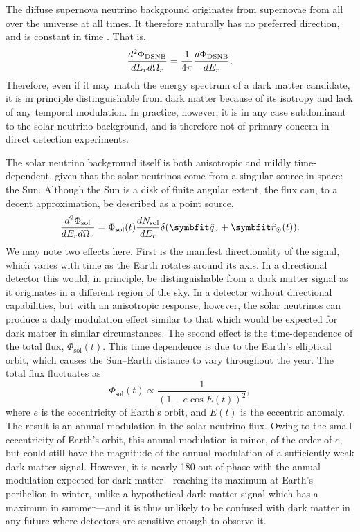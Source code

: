 The diffuse supernova neutrino background originates from supernovae from all over the universe at all times. It therefore naturally has no preferred direction, and is constant in time \parencite{Beacom2010}. That is,
\begin{equation}
    \frac{d^2\Phi_\text{DSNB}}{dE_rd\Omega_r}=\frac{1}{4\pi}\frac{d\Phi_\text{DSNB}}{dE_r}.
\end{equation}
Therefore, even if it may match the energy spectrum of a dark matter candidate, it is in principle distinguishable from dark matter because of its isotropy and lack of any temporal modulation. In practice, however, it is in any case subdominant to the solar neutrino background, and is therefore not of primary concern in direct detection experiments.

The solar neutrino background itself is both anisotropic and mildly time-dependent, given that the solar neutrinos come from a singular source in space: the Sun. Although the Sun is a disk of finite angular extent, the flux can, to a decent approximation, be described as a point source,
\begin{equation}
    \ddder{\Phi_\text{sol}}{E_r}{\Omega_r}=\Phi_\text{sol}(t)\der{N_\text{sol}}{E_r}\delta(\unitv{q}_\nu+\unitv{r}_\odot(t)).
\end{equation}
We may note two effects here. First is the manifest directionality of the signal, which varies with time as the Earth rotates around its axis. In a directional detector this would, in principle, be distinguishable from a dark matter signal as it originates in a different region of the sky. In a detector without directional capabilities, but with an anisotropic response, however, the solar neutrinos can produce a daily modulation effect similar to that which would be expected for dark matter in similar circumstances. The second effect is the time-dependence of the total flux, $\Phi_\text{sol}(t)$. This time dependence is due to the Earth's elliptical orbit, which causes the Sun--Earth distance to vary throughout the year. The total flux fluctuates as
\begin{equation}
    \Phi_\text{sol}(t)\propto\frac{1}{(1-e\cos E(t))^2},
\end{equation}
where $e$ is the eccentricity of Earth's orbit, and $E(t)$ is the eccentric anomaly. The result is an annual modulation in the solar neutrino flux. Owing to the small eccentricity of Earth's orbit, this annual modulation is minor, of the order of $e$, but could still have the magnitude of the annual modulation of a sufficiently weak dark matter signal. However, it is nearly 180\degree{} out of phase with the annual modulation expected for dark matter---reaching its maximum at Earth's perihelion in winter, unlike a hypothetical dark matter signal which has a maximum in summer---and it is thus unlikely to be confused with dark matter in any future where detectors are sensitive enough to observe it. 

